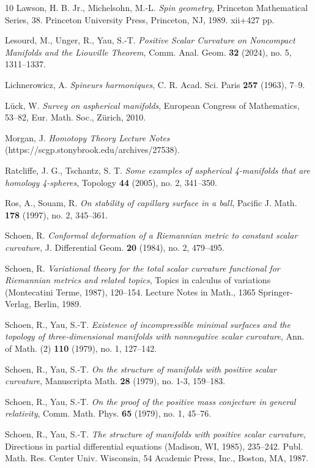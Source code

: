 \documentclass[11pt,letterpaper]{amsart}
\numberwithin{equation}{section}
\theoremstyle{definition}
\begin{document}
\begin{thebibliography}{10}
 Lawson, H. B. Jr., Michelsohn, M.-L. {\em Spin geometry}, Princeton Mathematical Series, 38. Princeton University Press, Princeton, NJ, 1989. xii+427 pp.

 Lesourd, M., Unger, R., Yau, S.-T. {\em Positive Scalar Curvature on Noncompact Manifolds and the Liouville Theorem}, {Comm. Anal. Geom. {\bf 32} (2024), no. 5, 1311--1337.}

 Lichnerowicz, A. {\em Spineurs harmoniques}, C. R. Acad. Sci. Paris {\bf 257} (1963), 7--9.

 L\"uck, W. {\em Survey on aspherical manifolds}, European Congress of Mathematics, 53--82, Eur. Math. Soc., Z\"{u}rich, 2010.


 Morgan, J. {\em Homotopy Theory Lecture Notes} (https://scgp.stonybrook.edu/archives/27538).

 Ratcliffe, J. G., Tschantz, S. T. {\em Some examples of aspherical 4-manifolds that are homology 4-spheres}, Topology {\bf 44} (2005), no. 2, 341--350.

Ros, A., Souam, R. {\em On stability of capillary surface in a ball}, Pacific J. Math. {\bf 178} (1997), no. 2, 345--361.

 Schoen, R. {\em Conformal deformation of a Riemannian metric to constant scalar curvature}, J. Differential Geom. {\bf 20} (1984), no. 2, 479--495.

 Schoen, R. {\em Variational theory for the total scalar curvature functional for Riemannian metrics and related topics}, Topics in calculus of variations (Montecatini Terme, 1987), 120--154. Lecture Notes in Math., 1365 Springer-Verlag, Berlin, 1989.

 Schoen, R., Yau, S.-T. {\em Existence of incompressible minimal surfaces
and the topology of three-dimensional manifolds with nonnegative scalar curvature},
Ann. of Math. (2) {\bf 110} (1979), no. 1, 127--142.

 Schoen, R., Yau, S.-T. {\em On the structure of manifolds with positive scalar curvature}, Manuscripta Math. {\bf 28} (1979), no. 1-3, 159--183.

 Schoen, R., Yau, S.-T. {\em On the proof of the positive mass conjecture in general relativity}, Comm. Math. Phys. {\bf 65} (1979), no. 1, 45--76.

 Schoen, R., Yau, S.-T. {\em The structure of manifolds with positive scalar curvature}, Directions in partial differential equations (Madison, WI, 1985), 235--242. Publ. Math. Res. Center Univ. Wisconsin, 54 Academic Press, Inc., Boston, MA, 1987.


\end{thebibliography}
\end{document}
